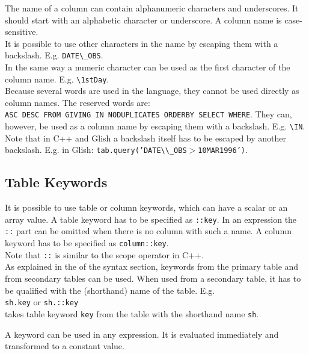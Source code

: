 The name of a column can contain alphanumeric characters and underscores.
It should start with an alphabetic character or underscore.
A column name is case-sensitive.
\\It is possible to use other characters in the name by
escaping them with a backslash. E.g. \texttt{DATE}\verb+\_+\texttt{OBS}.
\\In the same way a numeric character can be used as the first
character of the column name. E.g. \verb+\+\texttt{1stDay}.
\\
Because several words are used in the language, they cannot
be used directly as column names. The reserved words are:
\\\texttt{ASC DESC FROM GIVING IN NODUPLICATES ORDERBY SELECT WHERE}.
They can, however, be used as a column name by escaping
them with a backslash. E.g. \verb+\+\texttt{IN}.
\\Note that in C++ and Glish a backslash itself has to be escaped
by another backslash. E.g. in Glish:
\texttt{tab.query('DATE}\verb+\\_+\texttt{OBS$>$10MAR1996')}.

\subsection{\label{TAQL:KEYWORDS}Table Keywords}
It is possible to use table or column keywords, which can have
a scalar or an array value. A table keyword has to be specified
as \texttt{::key}. In an expression the \texttt{::} part can be omitted
when there is no column with such a name.
A column keyword has to be specified as \texttt{column::key}.
\\Note that \texttt{::} is similar to the scope operator in C++.
\\
As explained in the  of the syntax
section, keywords from the primary table and from secondary tables
can be used. When used from a secondary table, it has to be qualified
with the (shorthand) name of the table. E.g.
\\\texttt{sh.key} or \texttt{sh.::key}
\\takes table keyword \texttt{key} from the table with the shorthand name
\texttt{sh}.

A keyword can be used in any expression. It is evaluated immediately
and transformed to a constant value.

